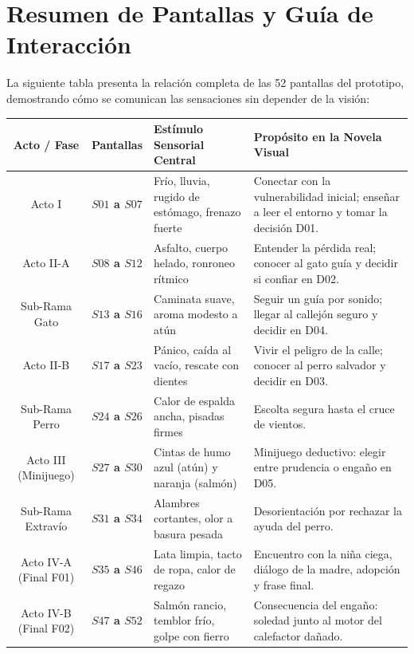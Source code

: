 \documentclass[11pt, a4paper]{article}
\begin{document}
\section*{Resumen de Pantallas y Guía de Interacción}

La siguiente tabla presenta la relación completa de las 52 pantallas del prototipo, demostrando cómo se comunican las sensaciones sin depender de la visión:

\begin{table}[H]
\centering
\small
\renewcommand{\arraystretch}{1.2}
\begin{tabularx}{\textwidth}{|c|>{\bfseries}p{}|p{}|X|}
\hline
\textbf{Acto / Fase} & \textbf{Pantallas} & \textbf{Estímulo Sensorial Central} & \textbf{Propósito en la Novela Visual} \\ \hline
Acto I & $S01$ a $S07$ & Frío, lluvia, rugido de estómago, frenazo fuerte & Conectar con la vulnerabilidad inicial; enseñar a leer el entorno y tomar la decisión D01. \\ \hline
Acto II-A & $S08$ a $S12$ & Asfalto, cuerpo helado, ronroneo rítmico & Entender la pérdida real; conocer al gato guía y decidir si confiar en D02. \\ \hline
Sub-Rama Gato & $S13$ a $S16$ & Caminata suave, aroma modesto a atún & Seguir un guía por sonido; llegar al callejón seguro y decidir en D04. \\ \hline
Acto II-B & $S17$ a $S23$ & Pánico, caída al vacío, rescate con dientes & Vivir el peligro de la calle; conocer al perro salvador y decidir en D03. \\ \hline
Sub-Rama Perro & $S24$ a $S26$ & Calor de espalda ancha, pisadas firmes & Escolta segura hasta el cruce de vientos. \\ \hline
Acto III (Minijuego) & $S27$ a $S30$ & Cintas de humo azul (atún) y naranja (salmón) & Minijuego deductivo: elegir entre prudencia o engaño en D05. \\ \hline
Sub-Rama Extravío & $S31$ a $S34$ & Alambres cortantes, olor a basura pesada & Desorientación por rechazar la ayuda del perro. \\ \hline
Acto IV-A (Final F01) & $S35$ a $S46$ & Lata limpia, tacto de ropa, calor de regazo & Encuentro con la niña ciega, diálogo de la madre, adopción y frase final. \\ \hline
Acto IV-B (Final F02) & $S47$ a $S52$ & Salmón rancio, temblor frío, golpe con fierro & Consecuencia del engaño: soledad junto al motor del calefactor dañado. \\ \hline
\end{tabularx}
\end{table}
\end{document}
